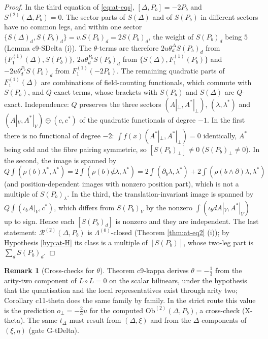 \documentclass[11pt]{article}
\numberwithin{equation}{section}
\theoremstyle{plain}
\theoremstyle{definition}
\newtheorem{remark}[theorem]{Remark}
\newcommand{\Ap}{A|_{\perp}}
\newcommand{\AV}{A|_V}
\newcommand{\Ob}{\mathrm{Ob}}
\newcommand{\dslash}{{\not d}}
\begin{document}
\begin{proof}
In the third equation of \eqref{eq:at-eqs}, $[\Delta,P_b]=-2P_b$ and $S^{(2)}(\Delta,P_b)=0$. The sector parts of $S(\Delta)$ and of $S(P_b)$ in different sectors have no common legs, and within one sector $\{S(\Delta)_d,S(P_b)_d\}=v.S(P_b)_d=2S(P_b)_d$, the weight of $S(P_b)_d$ being $5$ (Lemma c9-SDelta (i)). The $\theta$-terms are therefore $2u\theta^\Delta_dS(P_b)_d$ from $\{F_1^{(1)}(\Delta),S(P_b)\}$, $2u\theta^{P_b}_dS(P_b)_d$ from $\{S(\Delta),F_1^{(1)}(P_b)\}$ and $-2u\theta^{P_b}_dS(P_b)_d$ from $F_1^{(1)}(-2P_b)$. The remaining quadratic parts of $F_1^{(1)}(\Delta)$ are combinations of field-counting functionals, which commute with $S(P_b)$, and $Q$-exact terms, whose brackets with $S(P_b)$ and $S(\Delta)$ are $Q$-exact. Independence: $Q$ preserves the three sectors $(\Ap,A^*|_\perp)$, $(\lambda,\lambda^*)$ and $(\AV,A^*|_V)\oplus(c,c^*)$ of the quadratic functionals of degree $-1$. In the first there is no functional of degree $-2$: $\int f(x)(A^*|_\perp,A^*|_\perp)=0$ identically, $A^*$ being odd and the fibre pairing symmetric, so $[S(P_b)_\perp]\ne0$ ($S(P_b)_\perp\ne0$). In the second, the image is spanned by $Q\int(\rho(b)\lambda^*,\lambda^*)=2\int(\rho(b)\dslash\lambda,\lambda^*)=2\int(\partial_b\lambda,\lambda^*)+2\int(\rho(b\wedge\partial)\lambda,\lambda^*)$ (and position-dependent images with nonzero position part), which is not a multiple of $S(P_b)_\lambda$. In the third, the translation-invariant image is spanned by $Q\int(\iota_b\AV,c^*)$, which differs from $S(P_b)_V$ by the nonzero $\int(\iota_bd\AV,A^*|_V)$ up to sign. Hence each $[S(P_b)_d]$ is nonzero and they are independent. The last statement: $\mathcal R^{(2)}(\Delta,P_b)$ is $\Lambda^{(0)}$-closed (Theorem \ref{thm:at-eq2} (i)); by Hypothesis \ref{hyp:at-H} its class is a multiple of $[S(P_b)]$, whose two-leg part is $\sum_dS(P_b)_d$.
\end{proof}

\begin{remark}[Cross-checks for $\theta$]
\label{rem:at-thetacheck}
Theorem c9-kappa derives $\theta=-\tfrac13$ from the arity-two component of $L\circ L=0$ on the scalar bilinears, under the hypothesis that the quantisation and the local representatives exist through arity two; Corollary c11-theta does the same family by family. In the strict route this value is the prediction $o_\perp=-\tfrac23u$ for the computed $\Ob^{(2)}(\Delta,P_b)$, a cross-check (X-theta). The same $t_\Delta$ must result from $(\Delta,\xi)$ and from the $\Delta$-components of $(\xi,\eta)$ (gate G-tDelta).
\end{remark}
\end{document}
